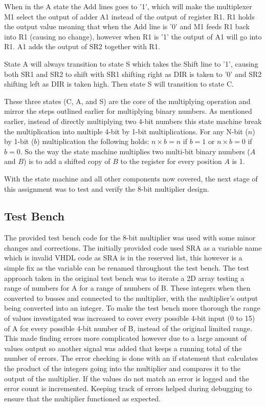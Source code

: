 \documentclass[11pt]{article}
\begin{document}
When in the A state the Add lines goes to '1', which will make the multiplexer M1 select the output of adder A1 instead of the output of register R1.
R1 holds the output value meaning that when the Add line is '0' and M1 feeds R1 back into R1 (causing no change), however when R1 is '1' the output of A1 will go into R1.
A1 adds the output of SR2 together with R1.

State A will always transition to state S which takes the Shift line to '1', causing both SR1 and SR2 to shift with SR1 shifting right as DIR is taken to '0' and SR2 shifting left as DIR is taken high.
Then state S will transition to state C.

These three states (C, A, and S) are the core of the multiplying operation and mirror the steps outlined earlier for multiplying binary numbers.
As mentioned earlier, instead of directly multiplying two 4-bit numbers this state machine break the multiplication into multiple 4-bit by 1-bit multiplications.
For any N-bit ($n$) by 1-bit ($b$) multiplication the following holds: $n \times b = n$ if $b = 1$ or $n \times b = 0$ if $b = 0$.
So the way the state machine multiplies two multi-bit binary numbers ($A$ and $B$) is to add a shifted copy of $B$ to the register for every position $A$ is 1\cite{dally}. 

With the state machine and all other components now covered, the next stage of this assignment was to test and verify the 8-bit multiplier design.

\subsection{Test Bench}
The provided test bench code for the 8-bit multiplier was used with some minor changes and corrections.
The initially provided code used SRA as a variable name which is invalid VHDL code as SRA is in the reserved list,
this however is a simple fix as the variable can be renamed throughout the test bench.
The test approach taken in the original test bench was to iterate a 2D array testing a range of numbers for A for a range of numbers of B.
These integers when then converted to busses and connected to the multiplier, with the multiplier's output being converted into an integer.
To make the test bench more thorough the range of values investigated was increased to cover every possible 4-bit input (0 to 15) of A for every possible 4-bit number of B, instead of the original limited range.
This made finding errors more complicated however due to a large amount of values output so another signal was added that keeps a running total of the number of errors.
The error checking is done with an if statement that calculates the product of the integers going into the multiplier and compares it to the output of the multiplier.
If the values do not match an error is logged and the error count is incremented. 
Keeping track of errors helped during debugging to ensure that the multiplier functioned as expected. 
\end{document}
